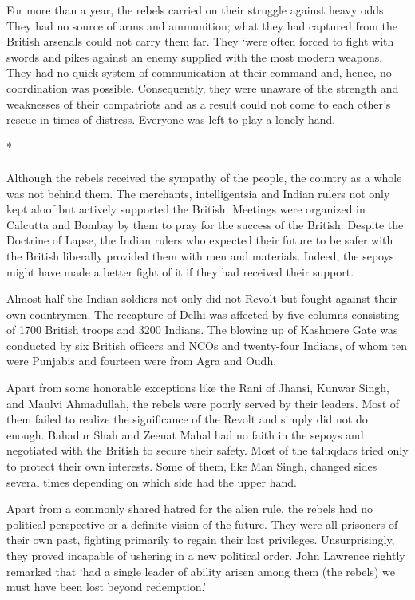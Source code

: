 For more than a year, the rebels carried on their struggle against heavy odds. They had no source of arms and ammunition; what they had captured from the British arsenals could not carry them far. They `were often forced to fight with swords and pikes against an enemy supplied with the most modern weapons. They had no quick system of communication at their command and, hence, no coordination was possible. Consequently, they were unaware of the strength and weaknesses of their compatriots and as a result could not come to each other's rescue in times of distress. Everyone was left to play a lonely hand.

\begin{center}*\end{center}

\paragraph*{}
Although the rebels received the sympathy of the people, the country as a whole was not behind them. The merchants, intelligentsia and Indian rulers not only kept aloof but actively supported the British. Meetings were organized in Calcutta and Bombay by them to pray for the success of the British. Despite the Doctrine of Lapse, the Indian rulers who expected their future to be safer with the British liberally provided them with men and materials. Indeed, the sepoys might have made a better fight of it if they had received their support.

Almost half the Indian soldiers not only did not Revolt but fought against their own countrymen. The recapture of Delhi was affected by five columns consisting of 1700 British troops and 3200 Indians. The blowing up of Kashmere Gate was conducted by six British officers and NCOs and twenty-four Indians, of whom ten were Punjabis and fourteen were from Agra and Oudh.

Apart from some honorable exceptions like the Rani of Jhansi, Kunwar Singh, and Maulvi Ahmadullah, the rebels were poorly served by their leaders. Most of them failed to realize the significance of the Revolt and simply did not do enough. Bahadur Shah and Zeenat Mahal had no faith in the sepoys and negotiated with the British to secure their safety. Most of the taluqdars tried only to protect their own interests. Some of them, like Man Singh, changed sides several times depending on which side had the upper hand.

Apart from a commonly shared hatred for the alien rule, the rebels had no political perspective or a definite vision of the future. They were all prisoners of their own past, fighting primarily to regain their lost privileges. Unsurprisingly, they proved incapable of ushering in a new political order. John Lawrence rightly remarked that `had a single leader of ability arisen among them (the rebels) we must have been lost beyond redemption.'

